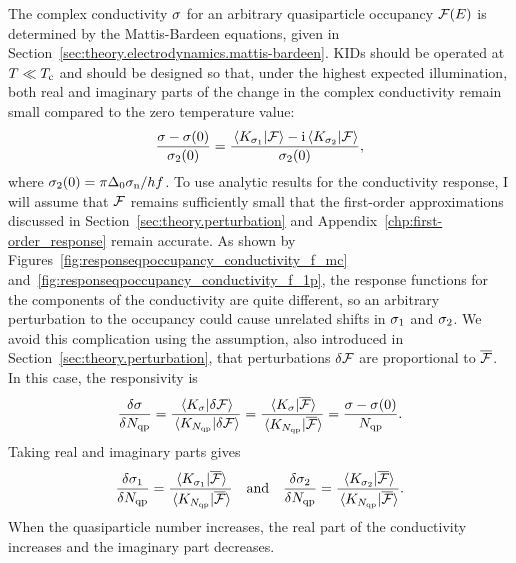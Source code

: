 The complex conductivity $\sigma$ for an arbitrary quasiparticle occupancy $\mathcal{F}(E)$ is determined by the Mattis-Bardeen equations, given in Section~\ref{sec:theory.electrodynamics.mattis-bardeen}.
KIDs should be operated at
$T \ll T_{\mathrm{c}}$
and should be designed so that, under the highest expected illumination, both real and imaginary parts of the change in the complex conductivity remain small compared to the zero temperature value:
\begin{equation}
\frac{\sigma - \sigma(0)}{\sigma_2(0)}
  =
  \frac{\braket*{K_{\sigma_1}}{\mathcal{F}} - \mathrm{i} \braket*{K_{\sigma_2}}{\mathcal{F}}}{\sigma_2(0)},
\end{equation}
where
$\sigma_2(0)
  =
  \pi \Delta_0 \sigma_{\mathrm{n}} / h f$.
To use analytic results for the conductivity response, I will assume that $\mathcal{F}$ remains sufficiently small that the first-order approximations discussed in Section~\ref{sec:theory.perturbation} and Appendix~\ref{chp:first-order_response} remain accurate.
As shown by Figures~\ref{fig:responseqpoccupancy_conductivity_f_mc} and~\ref{fig:responseqpoccupancy_conductivity_f_1p}, the response functions for the components of the conductivity are quite different, so an arbitrary perturbation to the occupancy could cause unrelated shifts in $\sigma_1$ and $\sigma_2$.
We avoid this complication using the assumption, also introduced in Section~\ref{sec:theory.perturbation},
that perturbations $\delta\mathcal{F}$ are proportional to $\overline{\mathcal{F}}$.
In this case, the responsivity is 
\begin{equation}
\frac{\delta\sigma}{\delta N_{\mathrm{qp}}}
  =
  \frac{\braket*{K_{\sigma}}{\delta\mathcal{F}}}{\braket*{K_{N_{\mathrm{qp}}}}{\delta\mathcal{F}}}
  =
  \frac{\braket*{K_{\sigma}}{\overline{\mathcal{F}}}}{\braket*{K_{N_{\mathrm{qp}}}}{\overline{\mathcal{F}}}}
  =
  \frac{\sigma - \sigma(0)}{N_{\mathrm{qp}}}.
\end{equation}
Taking real and imaginary parts gives
\begin{equation}
\frac{\delta\reconductivity}{\delta\qpnumber}
  =
  \frac{\braket*{\responseqpoccupancy_{\reconductivity}}{\ssqpoccupancy}}{\braket*{\responseqpoccupancy_{\qpnumber}}{\ssqpoccupancy}}
\qqtext{and}
\frac{\delta\imconductivity}{\delta\qpnumber}
  =
\frac{\braket*{\responseqpoccupancy_{\imconductivity}}{\ssqpoccupancy}}{\braket*{\responseqpoccupancy_{\qpnumber}}{\ssqpoccupancy}}.
\label{eqn:delta_conductivity_delta_qpnumber}
\end{equation}
When the quasiparticle number increases, the real part of the conductivity increases and the imaginary part decreases.

